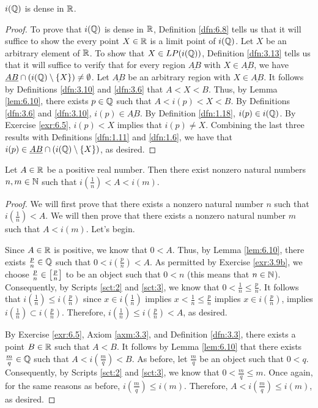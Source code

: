 \documentclass[../main.tex]{subfiles}
\begin{document}
\begin{theorem}\label{trm:6.11}
    $i(\mathbb{Q})$ is dense in $\mathbb{R}$.
    \begin{proof}
        To prove that $i(\mathbb{Q})$ is dense in $\mathbb{R}$, Definition \ref{dfn:6.8} tells us that it will suffice to show the every point $X\in\mathbb{R}$ is a limit point of $i(\mathbb{Q})$. Let $X$ be an arbitrary element of $\mathbb{R}$. To show that $X\in LP(i(\mathbb{Q}))$, Definition \ref{dfn:3.13} tells us that it will suffice to verify that for every region $\underline{AB}$ with $X\in\underline{AB}$, we have $\underline{AB}\cap(i(\mathbb{Q})\setminus\{X\})\neq\emptyset$. Let $\underline{AB}$ be an arbitrary region with $X\in\underline{AB}$. It follows by Definitions \ref{dfn:3.10} and \ref{dfn:3.6} that $A<X<B$. Thus, by Lemma \ref{lem:6.10}, there exists $p\in\mathbb{Q}$ such that $A<i(p)<X<B$. By Definitions \ref{dfn:3.6} and \ref{dfn:3.10}, $i(p)\in\underline{AB}$. By Definition \ref{dfn:1.18}, $i(p)\in i(\mathbb{Q})$. By Exercise \ref{exr:6.5}, $i(p)<X$ implies that $i(p)\neq X$. Combining the last three results with Definitions \ref{dfn:1.11} and \ref{dfn:1.6}, we have that $i(p)\in\underline{AB}\cap(i(\mathbb{Q})\setminus\{X\})$, as desired.
    \end{proof}
\end{theorem}

\begin{corollary}\label{cly:6.12}
    Let $A\in\mathbb{R}$ be a positive real number. Then there exist nonzero natural numbers $n,m\in\mathbb{N}$ such that $i(\frac{1}{n})<A<i(m)$.
    \begin{proof}
        We will first prove that there exists a nonzero natural number $n$ such that $i(\frac{1}{n})<A$. We will then prove that there exists a nonzero natural number $m$ such that $A<i(m)$. Let's begin.\par
        Since $A\in\mathbb{R}$ is positive, we know that $0<A$. Thus, by Lemma \ref{lem:6.10}, there exists $\frac{p}{n}\in\mathbb{Q}$ such that $0<i(\frac{p}{n})<A$. As permitted by Exercise \ref{exr:3.9b}, we choose $\frac{p}{n}\in\left[ \frac{p}{n} \right]$ to be an object such that $0<n$ (this means that $n\in\mathbb{N}$). Consequently, by Scripts \ref{sct:2} and \ref{sct:3}, we know that $0<\frac{1}{n}\leq\frac{p}{n}$. It follows that $i(\frac{1}{n})\leq i(\frac{p}{n})$ since $x\in i(\frac{1}{n})$ implies $x<\frac{1}{n}\leq\frac{p}{n}$ implies $x\in i(\frac{p}{n})$, implies $i(\frac{1}{n})\subset i(\frac{p}{n})$. Therefore, $i(\frac{1}{n})\leq i(\frac{p}{n})<A$, as desired.\par
        By Exercise \ref{exr:6.5}, Axiom \ref{axm:3.3}, and Definition \ref{dfn:3.3}, there exists a point $B\in\mathbb{R}$ such that $A<B$. It follows by Lemma \ref{lem:6.10} that there exists $\frac{m}{q}\in\mathbb{Q}$ such that $A<i(\frac{m}{q})<B$. As before, let $\frac{m}{q}$ be an object such that $0<q$. Consequently, by Scripts \ref{sct:2} and \ref{sct:3}, we know that $0<\frac{m}{q}\leq m$. Once again, for the same reasons as before, $i(\frac{m}{q})\leq i(m)$. Therefore, $A<i(\frac{m}{q})\leq i(m)$, as desired.
    \end{proof}
\end{corollary}
\end{document}
